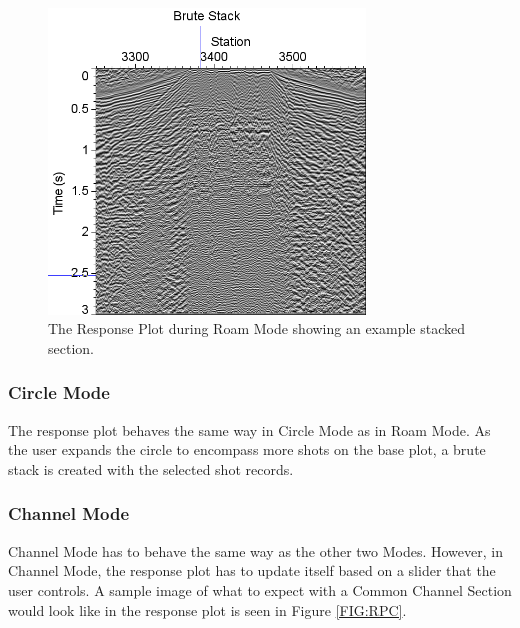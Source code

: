 \documentclass[12pt]{article}
\begin{document}
\begin{figure}[H]
\centering
\includegraphics[width=0.75\textwidth]{./figs/fig3.png}
\caption{The Response Plot during Roam Mode showing an example stacked section.}
\label{FIG:RPR}
\end{figure}

\subsubsection{Circle Mode}

The response plot behaves the same way in Circle Mode as in Roam Mode. As the user expands the circle to encompass more shots on the base plot, a brute stack is created with the selected shot records. 

\subsubsection{Channel Mode}

Channel Mode has to behave the same way as the other two Modes. However, in Channel Mode, the response plot has to update itself based on a slider that the user controls. A sample image of what to expect with a Common Channel Section would look like in the response plot is seen in Figure \ref{FIG:RPC}.
\end{document}
